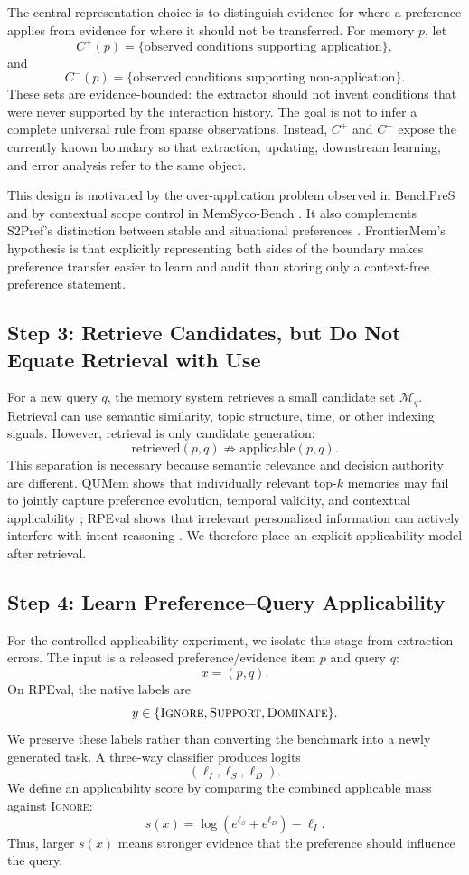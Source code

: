 \documentclass[11pt]{article}
\begin{document}
The central representation choice is to distinguish evidence for where a preference applies from evidence for where it should not be transferred. For memory $p$, let
\[
C^{+}(p)=\{\text{observed conditions supporting application}\},
\]
and
\[
C^{-}(p)=\{\text{observed conditions supporting non-application}\}.
\]
These sets are evidence-bounded: the extractor should not invent conditions that were never supported by the interaction history. The goal is not to infer a complete universal rule from sparse observations. Instead, $C^{+}$ and $C^{-}$ expose the currently known boundary so that extraction, updating, downstream learning, and error analysis refer to the same object.

This design is motivated by the over-application problem observed in BenchPreS \cite{yoon2026benchpres} and by contextual scope control in MemSyco-Bench \cite{xiang2026memsyco}. It also complements S2Pref's distinction between stable and situational preferences \cite{gao2026s2pref}. FrontierMem's hypothesis is that explicitly representing both sides of the boundary makes preference transfer easier to learn and audit than storing only a context-free preference statement.

\subsection{Step 3: Retrieve Candidates, but Do Not Equate Retrieval with Use}

For a new query $q$, the memory system retrieves a small candidate set $\mathcal{M}_q$. Retrieval can use semantic similarity, topic structure, time, or other indexing signals. However, retrieval is only candidate generation:
\[
\text{retrieved}(p,q) \not\Rightarrow \text{applicable}(p,q).
\]
This separation is necessary because semantic relevance and decision authority are different. QUMem shows that individually relevant top-$k$ memories may fail to jointly capture preference evolution, temporal validity, and contextual applicability \cite{wang2026qumem}; RPEval shows that irrelevant personalized information can actively interfere with intent reasoning \cite{feng2026rpeval}. We therefore place an explicit applicability model after retrieval.

\subsection{Step 4: Learn Preference--Query Applicability}

For the controlled applicability experiment, we isolate this stage from extraction errors. The input is a released preference/evidence item $p$ and query $q$:
\[
x=(p,q).
\]
On RPEval, the native labels are
\[
y\in\{\textsc{Ignore},\textsc{Support},\textsc{Dominate}\}.
\]
We preserve these labels rather than converting the benchmark into a newly generated task. A three-way classifier produces logits
\[
(\ell_I,\ell_S,\ell_D).
\]
We define an applicability score by comparing the combined applicable mass against \textsc{Ignore}:
\[
s(x)
=
\log\left(e^{\ell_S}+e^{\ell_D}\right)-\ell_I.
\]
Thus, larger $s(x)$ means stronger evidence that the preference should influence the query.
\end{document}
